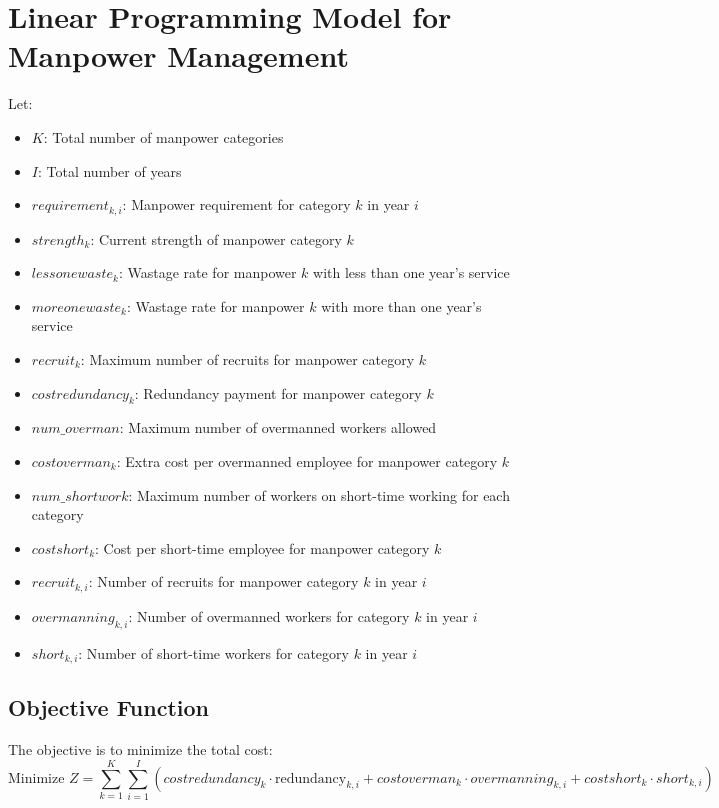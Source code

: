 \documentclass{article}
\begin{document}
\section*{Linear Programming Model for Manpower Management}

Let:
\begin{itemize}
    \item $K$: Total number of manpower categories
    \item $I$: Total number of years
    \item $requirement_{k,i}$: Manpower requirement for category $k$ in year $i$
    \item $strength_k$: Current strength of manpower category $k$
    \item $lessonewaste_k$: Wastage rate for manpower $k$ with less than one year's service
    \item $moreonewaste_k$: Wastage rate for manpower $k$ with more than one year's service
    \item $recruit_k$: Maximum number of recruits for manpower category $k$
    \item $costredundancy_k$: Redundancy payment for manpower category $k$
    \item $num\_overman$: Maximum number of overmanned workers allowed
    \item $costoverman_k$: Extra cost per overmanned employee for manpower category $k$
    \item $num\_shortwork$: Maximum number of workers on short-time working for each category
    \item $costshort_k$: Cost per short-time employee for manpower category $k$
    \item $recruit_{k,i}$: Number of recruits for manpower category $k$ in year $i$
    \item $overmanning_{k,i}$: Number of overmanned workers for category $k$ in year $i$
    \item $short_{k,i}$: Number of short-time workers for category $k$ in year $i$
\end{itemize}

\subsection*{Objective Function}
The objective is to minimize the total cost:
\[
\text{Minimize } Z = \sum_{k=1}^{K}\sum_{i=1}^{I} (costredundancy_k \cdot \text{redundancy}_{k,i} + costoverman_k \cdot overmanning_{k,i} + costshort_k \cdot short_{k,i})
\]
\end{document}
